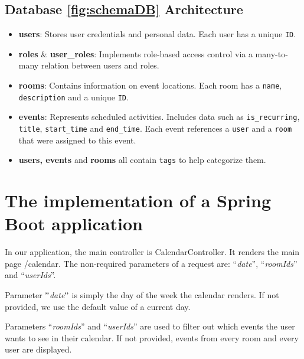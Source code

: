 \subsection*{Database \ref{fig:schemaDB} Architecture}

\begin{itemize}
  \item \textbf{users}: Stores user credentials and personal data.
  Each user has a unique \texttt{ID}.

  \item \textbf{roles} \& \textbf{user\_roles}: Implements role-based access control via a many-to-many relation between users and roles.

  \item \textbf{rooms}: Contains information on event locations.
  Each room has a \texttt{name}, \texttt{description} and a unique \texttt{ID}.

  \item \textbf{events}: Represents scheduled activities.
  Includes data such as  \texttt{is\_recurring}, \texttt{title}, \texttt{start\_time} and \texttt{end\_time}.
  Each event references a \texttt{user} and a \texttt{room} that were assigned to this event.

  \item \textbf{users, events }and \textbf{rooms} all contain \texttt{tags} to help categorize them.
\end{itemize}


\newpage%

\section{The implementation of a Spring Boot application}\label{sec:the-implementation-of-a-spring-boot-application}
In our application, the main controller is CalendarController.
It renders the main page /calendar.
The non-required parameters of a request are: ``\textit{date}'', ``\textit{roomIds}'' and ``\textit{userIds}''.

Parameter \("\)\textit{date}\("\) is simply the day of the week the calendar renders.
If not provided, we use the default value of a current day.

Parameters ``\textit{roomIds}'' and ``\textit{userIds}'' are used to filter out which events the user wants to see in their calendar.
If not provided, events from every room and every user are displayed.

